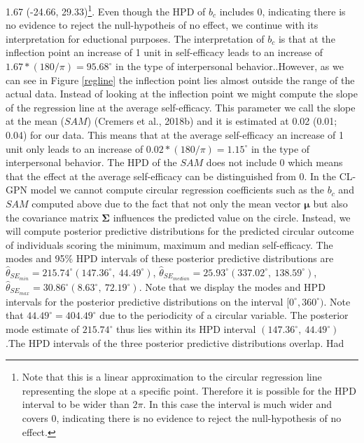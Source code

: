 \documentclass[12pt,]{article}
\let\rmarkdownfootnote\footnote%
\def\footnote{\protect\rmarkdownfootnote}
\begin{document}
1.67 (-24.66,
29.33)\footnote{Note that this is a linear approximation to the
circular regression line representing the slope at a specific point. Therefore
it is possible for the HPD interval to be wider than $2\pi$. In this case the
interval is much wider and covers 0, indicating there is no evidence to reject
the null-hypothesis of no effect.}. Even though the HPD of \(b_c\)
includes 0, indicating there is no evidence to reject the null-hypotheis
of no effect, we continue with its interpretation for eductional
purposes. The interpretation of \(b_c\) is that at the inflection point
an increase of 1 unit in self-efficacy leads to an increase of
\(1.67*(180/\pi) = 95.68^\circ\) in the type of interpersonal
behavior..However, as we can see in Figure \ref{regline} the inflection
point lies almost outside the range of the actual data. Instead of
looking at the inflection point we might compute the slope of the
regression line at the average self-efficacy. This parameter we call the
slope at the mean (\(SAM\)) (Cremers et al., 2018b) and it is estimated
at 0.02 (0.01; 0.04) for our data. This means that at the average
self-efficacy an increase of 1 unit only leads to an increase of
\(0.02*(180/\pi) = 1.15^\circ\) in the type of interpersonal behavior.
The HPD of the \(SAM\) does not include 0 which means that the effect at
the average self-efficacy can be distinguished from 0.\newline
\indent In the CL-GPN model we cannot compute circular regression
coefficients such as the \(b_c\) and \(SAM\) computed above due to the
fact that not only the mean vector \(\boldsymbol{\mu}\) but also the
covariance matrix \(\boldsymbol{\Sigma}\) influences the predicted value
on the circle. Instead, we will compute posterior predictive
distributions for the predicted circular outcome of individuals scoring
the minimum, maximum and median self-efficacy. The modes and 95\% HPD
intervals of these posterior predictive distributions are
\(\hat{\theta}_{SE_{min}} = 215.74^\circ (147.36^\circ, \: 44.49^\circ)\),
\(\hat{\theta}_{SE_{median}} = 25.93^\circ (337.02^\circ, \: 138.59^\circ)\),
\(\hat{\theta}_{SE_{max}} = 30.86^\circ (8.63^\circ, \: 72.19^\circ)\).
Note that we display the modes and HPD intervals for the posterior
predictive distributions on the interval \([0^\circ, 360^\circ)\). Note
that \(44.49^\circ = 404.49^\circ\) due to the periodicity of a circular
variable. The posterior mode estimate of \(215.74^\circ\) thus lies
within its HPD interval \((147.36^\circ, \: 44.49^\circ)\).The HPD
intervals of the three posterior predictive distributions overlap. Had
\end{document}
